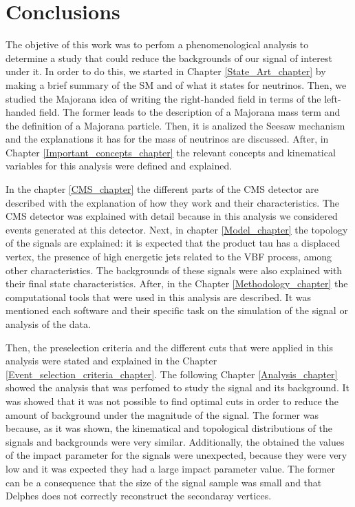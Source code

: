 \chapter{Conclusions} 
\label{Conclusion_chapter}

The objetive of this work was to perfom a phenomenological analysis to determine a study that could reduce the backgrounds of our signal of interest under it. In order to do this, we started in Chapter \ref{State_Art_chapter} by making a brief summary of the SM and of what it states for neutrinos. Then, we studied the Majorana idea of writing the right-handed field in terms of the left-handed field. The former leads to the description of a Majorana mass term and the definition of a Majorana particle. Then, it is analized the Seesaw mechanism and the explanations it has for the mass of neutrinos are discussed. After, in Chapter \ref{Important_concepts_chapter} the relevant concepts and kinematical variables for this analysis were defined and explained.

In the chapter \ref{CMS_chapter} the different parts of the CMS detector are described with the explanation of how they work and their characteristics. The CMS detector was explained with detail because in this analysis we considered events generated at this detector. Next, in chapter \ref{Model_chapter} the topology of the signals are explained: it is expected that the product tau has a displaced vertex, the presence of high energetic jets related to the VBF process, among other characteristics. The backgrounds of these signals were also explained with their final state characteristics. After, in the Chapter \ref{Methodology_chapter} the computational tools that were used in this analysis are described. It was mentioned each software and their specific task on the simulation of the signal or analysis of the data.  

Then, the preselection criteria and the different cuts that were applied in this analysis were stated and explained in the Chapter \ref{Event_selection_criteria_chapter}. The following Chapter \ref{Analysis_chapter} showed the analysis that was perfomed to study the signal and its background. It was showed that it was not possible to find optimal cuts in order to reduce the amount of background under the magnitude of the signal. The former was because, as it was shown, the kinematical and topological distributions of the signals and backgrounds were very similar.
Additionally, the obtained the values of the impact parameter for the signals were unexpected, because they were very low and it was expected they had a large impact parameter value. The former can be a consequence that the size of the signal sample was small and that Delphes does not correctly reconstruct the secondaray vertices.


